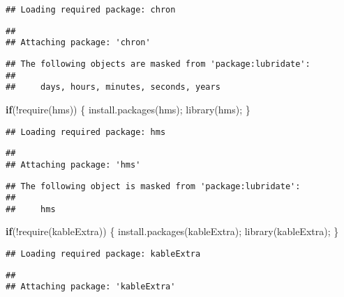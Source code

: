 \documentclass[
]{article}
\newenvironment{Shaded}{\begin{snugshade}}{\end{snugshade}}
\newcommand{\ControlFlowTok}[1]{\textcolor[rgb]{0.13,0.29,0.53}{\textbf{#1}}}
\newcommand{\FunctionTok}[1]{\textcolor[rgb]{0.00,0.00,0.00}{#1}}
\newcommand{\NormalTok}[1]{#1}
\newcommand{\SpecialCharTok}[1]{\textcolor[rgb]{0.00,0.00,0.00}{#1}}
\newcommand{\StringTok}[1]{\textcolor[rgb]{0.31,0.60,0.02}{#1}}
\begin{document}
\begin{verbatim}
## Loading required package: chron
\end{verbatim}

\begin{verbatim}
## 
## Attaching package: 'chron'
\end{verbatim}

\begin{verbatim}
## The following objects are masked from 'package:lubridate':
## 
##     days, hours, minutes, seconds, years
\end{verbatim}

\begin{Shaded}
\begin{Highlighting}[]
\ControlFlowTok{if}\NormalTok{(}\SpecialCharTok{!}\FunctionTok{require}\NormalTok{(}\StringTok{\textquotesingle{}hms\textquotesingle{}}\NormalTok{))}
\NormalTok{\{}
  \FunctionTok{install.packages}\NormalTok{(}\StringTok{\textquotesingle{}hms\textquotesingle{}}\NormalTok{);}
  \FunctionTok{library}\NormalTok{(hms);}
\NormalTok{\}}
\end{Highlighting}
\end{Shaded}

\begin{verbatim}
## Loading required package: hms
\end{verbatim}

\begin{verbatim}
## 
## Attaching package: 'hms'
\end{verbatim}

\begin{verbatim}
## The following object is masked from 'package:lubridate':
## 
##     hms
\end{verbatim}

\begin{Shaded}
\begin{Highlighting}[]
\ControlFlowTok{if}\NormalTok{(}\SpecialCharTok{!}\FunctionTok{require}\NormalTok{(}\StringTok{\textquotesingle{}kableExtra\textquotesingle{}}\NormalTok{))}
\NormalTok{\{}
  \FunctionTok{install.packages}\NormalTok{(kableExtra);}
  \FunctionTok{library}\NormalTok{(kableExtra);}
\NormalTok{\}}
\end{Highlighting}
\end{Shaded}

\begin{verbatim}
## Loading required package: kableExtra
\end{verbatim}

\begin{verbatim}
## 
## Attaching package: 'kableExtra'
\end{verbatim}
\end{document}
